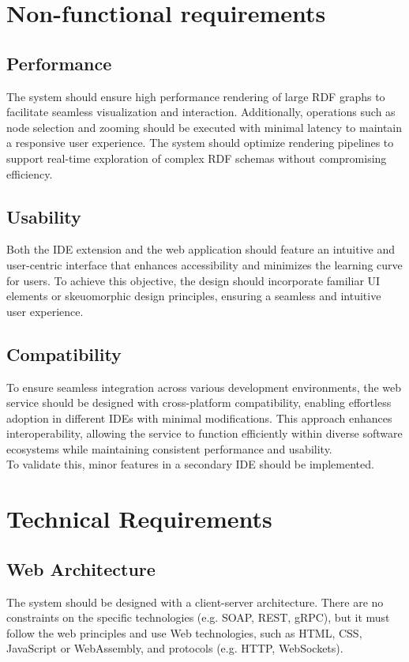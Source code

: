 \section{Non-functional requirements\label{sec:techreq}}
\subsection{Performance\label{sec:reqsuba}}
The system should ensure high performance rendering of large RDF graphs to facilitate seamless visualization and interaction. Additionally, operations such as node selection and zooming should be executed with minimal latency to maintain a responsive user experience. The system should optimize rendering pipelines to support real-time exploration of complex RDF schemas without compromising efficiency.

\subsection{Usability\label{sec:reqsuba}}
Both the IDE extension and the web application should feature an intuitive and user-centric interface that enhances accessibility and minimizes the learning curve for users. To achieve this objective, the design should incorporate familiar UI elements or skeuomorphic design principles, ensuring a seamless and intuitive user experience. 

\subsection{Compatibility\label{sec:reqsuba}}
To ensure seamless integration across various development environments, the web service should be designed with cross-platform compatibility, enabling effortless adoption in different IDEs with minimal modifications. This approach enhances interoperability, allowing the service to function efficiently within diverse software ecosystems while maintaining consistent performance and usability. 
\\
To validate this, minor features in a secondary IDE should be implemented.


\section{Technical Requirements\label{sec:techreq}}

\subsection{Web Architecture\label{sec:reqsuba}}
The system should be designed with a client-server architecture. There are no constraints on the specific technologies (e.g. SOAP, REST, gRPC), but it must follow the web principles and use Web technologies, such as HTML, CSS, JavaScript or WebAssembly, and protocols (e.g. HTTP, WebSockets).

